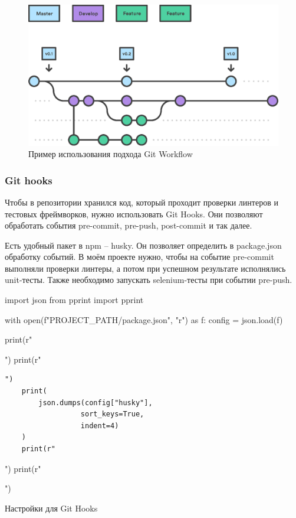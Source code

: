 \begin{figure}[h!]
    \begin{center}
        \includegraphics[scale=0.6]{images/git-workflow.eps}
    \end{center}
    \caption{Пример использования подхода Git Workflow}
\end{figure}

\subsubsection{Git hooks}
Чтобы в репозитории хранился код, который проходит проверки линтеров и тестовых фреймворков, нужно использовать Git Hooks. Они позволяют обработать события pre-commit, pre-push, post-commit и так далее.

Есть удобный пакет в npm -- husky. Он позволяет определить в package.json обработку событий. В моём проекте нужно, чтобы на событие pre-commit выполняли проверки линтеры, а потом при успешном результате исполнялись unit-тесты. Также необходимо запускать selenium-тесты при событии pre-push.

\begin{listing}[h!]
\begin{pycode}
import json
from pprint import pprint

with open(f"{PROJECT_PATH}/package.json", "r") as f:
    config = json.load(f)

    print(r"\begin{noerr}")
    print(r"\begin{verbatim}")
    print(
        json.dumps(config["husky"],
                  sort_keys=True,
                  indent=4)
    )
    print(r"\end{verbatim}")
    print(r"\end{noerr}")
\end{pycode}
\caption{Настройки для Git Hooks}
\end{listing}

\clearpage